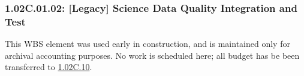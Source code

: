 \subsubsection*{1.02C.01.02: [Legacy] Science Data Quality Integration and Test}

This WBS element was used early in construction, and is maintained only for
archival accounting purposes. No work is scheduled here; all budget has be
been transferred to \hyperref[wbs:1.02C.10]{1.02C.10}.

